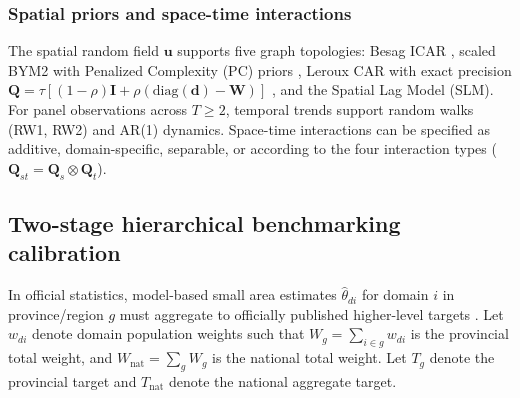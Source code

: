 \documentclass[article]{jss}
\begin{document}
\subsubsection{Spatial priors and space-time interactions}
The spatial random field $\bm{u}$ supports five graph topologies: Besag ICAR \citep{besag1991bayesian}, scaled BYM2 with Penalized Complexity (PC) priors \citep{riebler2016intuitive, simpson2017penalising}, Leroux CAR with exact precision $\bm{Q} = \tau[(1 - \rho)\bm{I} + \rho(\mathrm{diag}(\bm{d}) - \bm{W})]$ \citep{leroux2000estimation}, and the Spatial Lag Model (SLM). For panel observations across $T \ge 2$, temporal trends support random walks (RW1, RW2) and AR(1) dynamics. Space-time interactions can be specified as additive, domain-specific, separable, or according to the four \citet{knorrheld2000bayesian} interaction types ($\bm{Q}_{st} = \bm{Q}_s \otimes \bm{Q}_t$).

\subsection{Two-stage hierarchical benchmarking calibration} \label{sec:methods_bench}

In official statistics, model-based small area estimates $\hat{\theta}_{di}$ for domain $i$ in province/region $g$ must aggregate to officially published higher-level targets \citep{rao2015small, stefan2020benchmarking}. Let $w_{di}$ denote domain population weights such that $W_g = \sum_{i \in g} w_{di}$ is the provincial total weight, and $W_{\text{nat}} = \sum_g W_g$ is the national total weight. Let $T_g$ denote the provincial target and $T_{\text{nat}}$ denote the national aggregate target.
\end{document}
